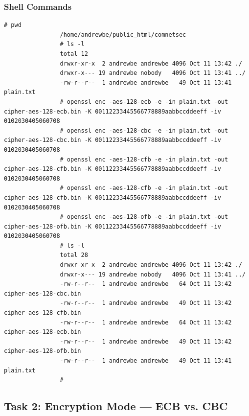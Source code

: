 		\subsubsection{Shell Commands}
			\begin{lstlisting}[label={Shell Commands},caption={Task 1}]
				# pwd
				/home/andrewbe/public_html/comnetsec
				# ls -l
				total 12
				drwxr-xr-x  2 andrewbe andrewbe 4096 Oct 11 13:42 ./
				drwxr-x--- 19 andrewbe nobody   4096 Oct 11 13:41 ../
				-rw-r--r--  1 andrewbe andrewbe   49 Oct 11 13:41 plain.txt
				# openssl enc -aes-128-ecb -e -in plain.txt -out cipher-aes-128-ecb.bin -K 00112233445566778889aabbccddeeff -iv 0102030405060708
				# openssl enc -aes-128-cbc -e -in plain.txt -out cipher-aes-128-cbc.bin -K 00112233445566778889aabbccddeeff -iv 0102030405060708
				# openssl enc -aes-128-cfb -e -in plain.txt -out cipher-aes-128-cfb.bin -K 00112233445566778889aabbccddeeff -iv 0102030405060708
				# openssl enc -aes-128-cfb -e -in plain.txt -out cipher-aes-128-cfb.bin -K 00112233445566778889aabbccddeeff -iv 0102030405060708
				# openssl enc -aes-128-ofb -e -in plain.txt -out cipher-aes-128-ofb.bin -K 00112233445566778889aabbccddeeff -iv 0102030405060708
				# ls -l
				total 28
				drwxr-xr-x  2 andrewbe andrewbe 4096 Oct 11 13:42 ./
				drwxr-x--- 19 andrewbe nobody   4096 Oct 11 13:41 ../
				-rw-r--r--  1 andrewbe andrewbe   64 Oct 11 13:42 cipher-aes-128-cbc.bin
				-rw-r--r--  1 andrewbe andrewbe   49 Oct 11 13:42 cipher-aes-128-cfb.bin
				-rw-r--r--  1 andrewbe andrewbe   64 Oct 11 13:42 cipher-aes-128-ecb.bin
				-rw-r--r--  1 andrewbe andrewbe   49 Oct 11 13:42 cipher-aes-128-ofb.bin
				-rw-r--r--  1 andrewbe andrewbe   49 Oct 11 13:41 plain.txt
				#
			\end{lstlisting}
	\pagebreak
	\subsection{Task 2: Encryption Mode — ECB vs. CBC}
	
